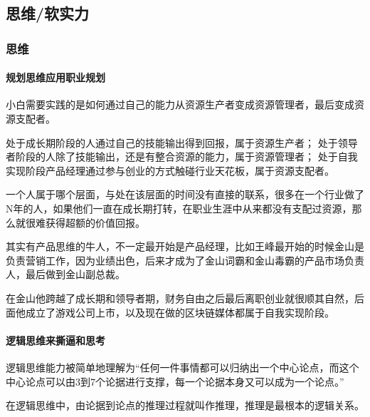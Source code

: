 \documentclass[letterpaper,11pt,english]{sphinxmanual}
\begin{document}
\subsection{思维/软实力}
\label{\detokenize{chapter_idea/index:chap-idea}}\label{\detokenize{chapter_idea/index:id1}}\label{\detokenize{chapter_idea/index::doc}}

\subsubsection{思维}
\label{\detokenize{chapter_idea/idea:id1}}\label{\detokenize{chapter_idea/idea::doc}}

\paragraph{规划思维应用职业规划}
\label{\detokenize{chapter_idea/idea:id2}}
小白需要实践的是如何通过自己的能力从资源生产者变成资源管理者，最后变成资源支配者。
%
\begin{footnote}[306]\sphinxAtStartFootnote
{}
%
\end{footnote}

处于成长期阶段的人通过自己的技能输出得到回报，属于资源生产者；
处于领导者阶段的人除了技能输出，还是有整合资源的能力，属于资源管理者；
处于自我实现阶段产品经理通过参与创业的方式触碰行业天花板，属于资源支配者。

一个人属于哪个层面，与处在该层面的时间没有直接的联系，很多在一个行业做了N年的人，如果他们一直在成长期打转，在职业生涯中从来都没有支配过资源，那么就很难获得超额的价值回报。

其实有产品思维的牛人，不一定最开始是产品经理，比如王峰最开始的时候金山是负责营销工作，因为业绩出色，后来才成为了金山词霸和金山毒霸的产品市场负责人，最后做到金山副总裁。

在金山他跨越了成长期和领导者期，财务自由之后最后离职创业就很顺其自然，后面他成立了游戏公司上市，以及现在做的区块链媒体都属于自我实现阶段。


\paragraph{逻辑思维来撕逼和思考}
\label{\detokenize{chapter_idea/idea:id3}}
逻辑思维能力被简单地理解为“任何一件事情都可以归纳出一个中心论点，而这个中心论点可以由3到7个论据进行支撑，每一个论据本身又可以成为一个论点。”

在逻辑思维中，由论据到论点的推理过程就叫作推理，推理是最根本的逻辑关系。
\end{document}
